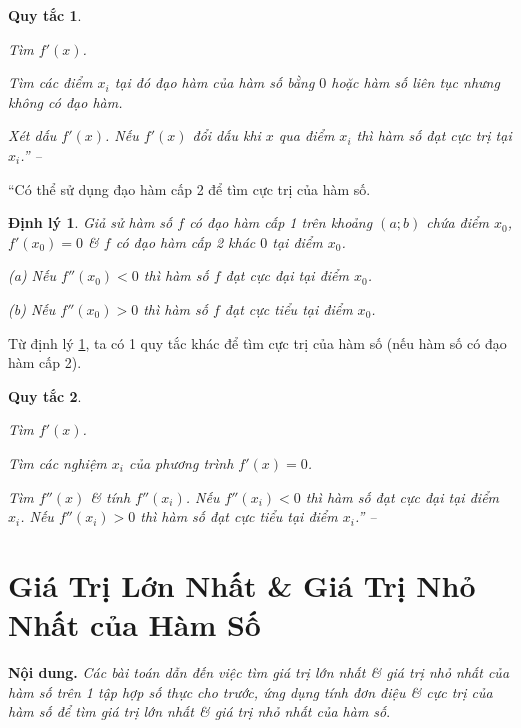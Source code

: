 \documentclass[oneside]{book}
\numberwithin{equation}{section}
\newtheorem{quytac}{Quy tắc}
\newtheorem{dinhly}{Định lý}[section]
\begin{document}
\begin{quytac}
	\begin{enumerate*}
		\item Tìm $f'(x)$.
		\item Tìm các điểm $x_i$ tại đó đạo hàm của hàm số bằng $0$ hoặc hàm số liên tục nhưng không có đạo hàm.
		\item Xét dấu $f'(x)$. Nếu $f'(x)$ đổi dấu khi $x$ qua điểm $x_i$ thì hàm số đạt cực trị tại $x_i$.'' -- \cite[pp. 11--14]{SGK_Toan_12_giai_tich_nang_cao}
	\end{enumerate*}
\end{quytac}
``Có thể sử dụng đạo hàm cấp 2 để tìm cực trị của hàm số.

\begin{dinhly}
	\label{thm:dao ham cap 2 & cuc tri ham so}
	Giả sử hàm số $f$ có đạo hàm cấp 1 trên khoảng $(a;b)$ chứa điểm $x_0$, $f'(x_0) = 0$ \& $f$ có đạo hàm cấp 2 khác $0$ tại điểm $x_0$.
	\begin{enumerate*}
		\item[(a)] Nếu $f''(x_0) < 0$ thì hàm số $f$ đạt cực đại tại điểm $x_0$.
		\item[(b)] Nếu $f''(x_0) > 0$ thì hàm số $f$ đạt cực tiểu tại điểm $x_0$.
	\end{enumerate*}
\end{dinhly}
Từ định lý \ref{thm:dao ham cap 2 & cuc tri ham so}, ta có 1 quy tắc khác để tìm cực trị của hàm số (nếu hàm số có đạo hàm cấp 2).

\begin{quytac}
	\begin{enumerate*}
		\item Tìm $f'(x)$.
		\item Tìm các nghiệm $x_i$ của phương trình $f'(x) = 0$.
		\item Tìm $f''(x)$ \& tính $f''(x_i)$. Nếu $f''(x_i) < 0$ thì hàm số đạt cực đại tại điểm $x_i$. Nếu $f''(x_i) > 0$ thì hàm số đạt cực tiểu tại điểm $x_i$.'' -- \cite[pp. 15--16]{SGK_Toan_12_giai_tich_nang_cao}
	\end{enumerate*}
\end{quytac}


\section{Giá Trị Lớn Nhất \& Giá Trị Nhỏ Nhất của Hàm Số}
\textbf{Nội dung.} \textit{Các bài toán dẫn đến việc tìm giá trị lớn nhất \& giá trị nhỏ nhất của hàm số trên 1 tập hợp số thực cho trước, ứng dụng tính đơn điệu \& cực trị của hàm số để tìm giá trị lớn nhất \& giá trị nhỏ nhất của hàm số}.
\end{document}
